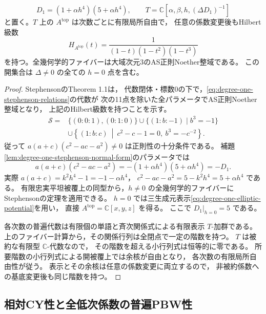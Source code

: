 \begin{lemma}\label{lem:degree-one-elliptic-top-as-open}
\[
 D_1=(1+\alpha h^4)(5+\alpha h^4),\qquad
 T=\mathbb C[\alpha,\beta,h,(\Delta D_1)^{-1}]
\]
と置く。$T$ 上の $A^{\mathrm{top}}$ は次数ごとに有限局所自由で，
任意の係数変更後もHilbert級数
\[
 H_{A^{\mathrm{top}}}(t)=\frac1{(1-t)(1-t^2)(1-t^3)}
\]
を持つ。全幾何学的ファイバーは大域次元3のAS正則Noether整域である。
この開集合は $\Delta\ne0$ の全ての $h=0$ 点を含む。
\end{lemma}
\begin{proof}
StephensonのTheorem 1.1\cite[p.~2318]{Stephenson1997}は，
代数閉体・標数0の下で，\eqref{eq:degree-one-stephenson-relations}の代数が
次の11点を除いた全パラメータでAS正則Noether整域となり，
上記のHilbert級数を持つことを示す。
\[
 \begin{split}
 \mathcal S={}&\{(0:0:1),(0:1:0)\}
    \cup\{(1:b:-1)\mid b^3=-1\}\\
   &\cup\left\{(1:b:c)\ \middle|\
          c^2-c-1=0,\ b^3=-c^{-2}\right\}.
 \end{split}
\]
従って $a(a+c)(c^2-ac-a^2)\ne0$ は正則性の十分条件である。
補題\ref{lem:degree-one-stephenson-normal-form}のパラメータでは
\begin{equation}\label{eq:degree-one-as-discriminant}
 a(a+c)(c^2-ac-a^2)
  =-(1+\alpha h^4)(5+\alpha h^4)=-D_1.
\end{equation}
実際 $a(a+c)=k^2h^4-1=-1-\alpha h^4$，
$c^2-ac-a^2=5-k^2h^4=5+\alpha h^4$ である。
有限忠実平坦被覆上の同型から，$h\ne0$ の全幾何学的ファイバーに
Stephensonの定理を適用できる。
$h=0$ では三生成元表示\eqref{eq:degree-one-elliptic-potential}を用い，
直接 $A^{\mathrm{top}}=\mathbb C[x,y,z]$ を得る。
ここで $D_1|_{h=0}=5$ である。

各次数の普遍代数は有限個の単語と斉次関係式による有限表示 $T$-加群である。
上のファイバー計算から，その関係行列は全閉点で一定の階数を持つ。
$T$ は被約な有限型 $\mathbb C$-代数なので，
その階数を超える小行列式は恒等的に零である。
所要階数の小行列式による開被覆上では余核が自由となり，
各次数の有限局所自由性が従う。
表示とその余核は任意の係数変更に両立するので，
非被約係数への基底変更後も同じ階数を持つ。
\end{proof}

\subsection{相対CY性と全低次係数の普遍PBW性}


